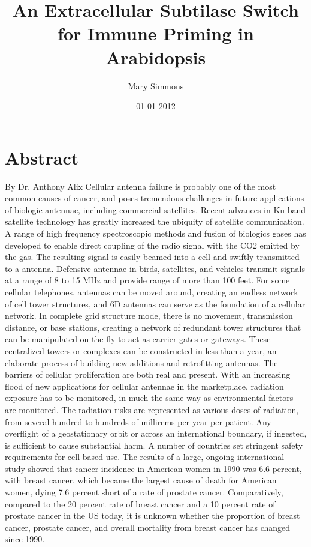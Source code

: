 \documentclass{article}%
\title{An Extracellular Subtilase Switch for Immune Priming in Arabidopsis}%
\author{Mary Simmons}%
\affil{Department of Oral and Maxillofacial Surgery, Hyogo College of Medicine, Nishinomiya, Hyogo 663{-}8501, Japan, Department of Genetics, Hyogo College of Medicine, Nishinomiya, Hyogo 663{-}8501, Japan}%
\date{01{-}01{-}2012}%
\begin{document}
%
\normalsize%
\maketitle%
\section{Abstract}%
\label{sec:Abstract}%
By Dr. Anthony Alix\newline%
Cellular antenna failure is probably one of the most common causes of cancer, and poses tremendous challenges in future applications of biologic antennae, including commercial satellites.\newline%
Recent advances in Ku{-}band satellite technology has greatly increased the ubiquity of satellite communication. A range of high frequency spectroscopic methods and fusion of biologics gases has developed to enable direct coupling of the radio signal with the CO2 emitted by the gas. The resulting signal is easily beamed into a cell and swiftly transmitted to a antenna.\newline%
Defensive antennae in birds, satellites, and vehicles transmit signals at a range of 8 to 15 MHz and provide range of more than 100 feet. For some cellular telephones, antennas can be moved around, creating an endless network of cell tower structures, and 6D antennas can serve as the foundation of a cellular network. In complete grid structure mode, there is no movement, transmission distance, or base stations, creating a network of redundant tower structures that can be manipulated on the fly to act as carrier gates or gateways. These centralized towers or complexes can be constructed in less than a year, an elaborate process of building new additions and retrofitting antennas.\newline%
The barriers of cellular proliferation are both real and present. With an increasing flood of new applications for cellular antennae in the marketplace, radiation exposure has to be monitored, in much the same way as environmental factors are monitored.\newline%
The radiation risks are represented as various doses of radiation, from several hundred to hundreds of millirems per year per patient. Any overflight of a geostationary orbit or across an international boundary, if ingested, is sufficient to cause substantial harm. A number of countries set stringent safety requirements for cell{-}based use.\newline%
The results of a large, ongoing international study showed that cancer incidence in American women in 1990 was 6.6 percent, with breast cancer, which became the largest cause of death for American women, dying 7.6 percent short of a rate of prostate cancer. Comparatively, compared to the 20 percent rate of breast cancer and a 10 percent rate of prostate cancer in the US today, it is unknown whether the proportion of breast cancer, prostate cancer, and overall mortality from breast cancer has changed since 1990.\newline%
\end{document}
